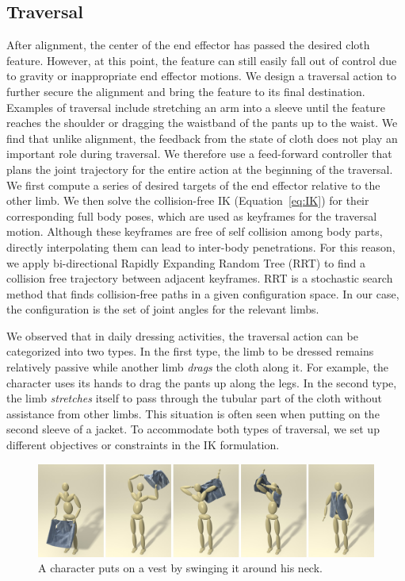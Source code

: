 \subsection{Traversal}
After alignment, the center of the end effector has passed the desired cloth feature. However, at this point, the feature can still easily fall out of control due to gravity or inappropriate end effector motions. We design a traversal action to further secure the alignment and bring the feature to its final destination. Examples of traversal include stretching an arm into a sleeve until the feature reaches the shoulder or dragging the waistband of the pants up to the waist. We find that unlike alignment, the feedback from the state of cloth does not play an important role during traversal. We therefore use a feed-forward controller that plans the joint trajectory for the entire action at the beginning of the traversal. We first compute a series of desired targets of the end effector relative to the other limb. We then solve the collision-free IK (Equation~\ref{eq:IK}) for their corresponding full body poses, which are used as keyframes for the traversal motion. Although these keyframes are free of self collision among body parts, directly interpolating them can lead to inter-body penetrations. For this reason, we apply bi-directional Rapidly Expanding Random Tree (RRT) \cite{LaValleK:2001} to find a collision free trajectory between adjacent keyframes. RRT is a stochastic search method that finds collision-free paths in a given configuration space. In our case, the configuration is the set of joint angles for the relevant limbs.  

We observed that in daily dressing activities, the traversal action can be categorized into two types. In the first type, the limb to be dressed remains relatively passive while another limb \emph{drags} the cloth along it. For example, the character uses its hands to drag the pants up along the legs. In the second type, the limb \emph{stretches} itself to pass through the tubular part of the cloth without assistance from other limbs. This situation is often seen when putting on the second sleeve of a jacket. To accommodate both types of traversal, we set up different objectives or constraints in the IK formulation.


\begin{figure}[!t]
  \centering
  \includegraphics[width=\textwidth]{images/vest}
  \caption{A character puts on a vest by swinging it around his neck.}
  \label{fig:vest}
\end{figure}

